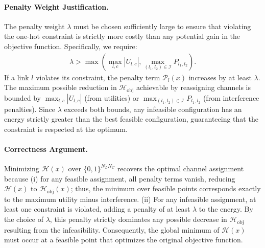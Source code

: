 \documentclass[12pt]{article}
\begin{document}
\paragraph{Penalty Weight Justification.}
The penalty weight $\lambda$ must be chosen sufficiently large to ensure that violating the one-hot constraint is strictly more costly than any potential gain in the objective function. Specifically, we require:
\begin{align}
\lambda > \max \left( \max_{l,c} |U_{l,c}|, \max_{(l_1,l_2) \in \mathcal{I}} P_{l_1,l_2} \right).
\end{align}
If a link $l$ violates its constraint, the penalty term $\mathcal{P}_l(x)$ increases by at least $\lambda$. The maximum possible reduction in $\mathcal{H}_{\text{obj}}$ achievable by reassigning channels is bounded by $\max_{l,c} |U_{l,c}|$ (from utilities) or $\max_{(l_1,l_2) \in \mathcal{I}} P_{l_1,l_2}$ (from interference penalties). Since $\lambda$ exceeds both bounds, any infeasible configuration has an energy strictly greater than the best feasible configuration, guaranteeing that the constraint is respected at the optimum.

\paragraph{Correctness Argument.}
Minimizing $\mathcal{H}(x)$ over $\{0,1\}^{N_L N_C}$ recovers the optimal channel assignment because (i) for any feasible assignment, all penalty terms vanish, reducing $\mathcal{H}(x)$ to $\mathcal{H}_{\text{obj}}(x)$; thus, the minimum over feasible points corresponds exactly to the maximum utility minus interference. (ii) For any infeasible assignment, at least one constraint is violated, adding a penalty of at least $\lambda$ to the energy. By the choice of $\lambda$, this penalty strictly dominates any possible decrease in $\mathcal{H}_{\text{obj}}$ resulting from the infeasibility. Consequently, the global minimum of $\mathcal{H}(x)$ must occur at a feasible point that optimizes the original objective function.
\end{document}
